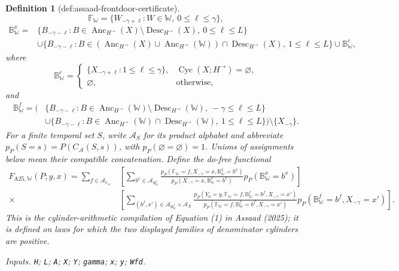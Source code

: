 \documentclass{article}
\newtheorem{definition}{Definition}
\begin{document}
\begin{definition}[def:assaad-frontdoor-certificate]
\[
 \mathbb F_{\mathbb W}
 =\{W_{-\gamma+\ell}:W\in\mathbb W,\ 0\le \ell\le\gamma\},
\]
\[
 \begin{split}
 \mathbb B^x_{\mathbb W}
 ={}&\{B_{-\gamma-\ell}:B\in
 \operatorname{Anc}_{H^{\to}}(X)\setminus
 \operatorname{Desc}_{H^{\to}}(X),\ 0\le\ell\le L\}\\
 &\cup\{B_{-\gamma-\ell}:B\in
 (\operatorname{Anc}_{H^{\to}}(X)\cup
 \operatorname{Anc}_{H^{\to}}(\mathbb W))\cap
 \operatorname{Desc}_{H^{\to}}(X),\ 1\le\ell\le L\}
 \cup\mathbb B^c_{\mathbb W},
 \end{split}
\]
where
\[
 \mathbb B^c_{\mathbb W}=
 \begin{cases}
 \{X_{-\gamma+\ell}:1\le\ell\le\gamma\},
 &\operatorname{Cyc}(X;H^{\to})=\varnothing,\\
 \varnothing,&\text{otherwise},
 \end{cases}
\]
and
\[
 \begin{split}
 \mathbb B^f_{\mathbb W}
 =\Big(&\{B_{-\gamma-\ell}:B\in
 \operatorname{Anc}_{H^{\to}}(\mathbb W)\setminus
 \operatorname{Desc}_{H^{\to}}(\mathbb W),\ -\gamma\le\ell\le L\}\\
 &\cup\{B_{-\gamma-\ell}:B\in
 \operatorname{Anc}_{H^{\to}}(\mathbb W)\cap
 \operatorname{Desc}_{H^{\to}}(\mathbb W),\ 1\le\ell\le L\}\Big)
 \setminus\{X_{-\gamma}\}.
 \end{split}
\]
For a finite temporal set \(S\), write \(\mathcal A_S\) for its product alphabet and abbreviate \(p_P(S=s)=P(C_{\mathcal A}(S,s))\), with \(p_P(\varnothing=\varnothing)=1\).  Unions of assignments below mean their compatible concatenation.  Define the do-free functional
\[
 \begin{split}
 F_{\mathrm{A25},\mathbb W}(P;y,x)
 =\sum_{f\in\mathcal A_{\mathbb F_{\mathbb W}}}
 &\left[\sum_{b^x\in\mathcal A_{\mathbb B^x_{\mathbb W}}}
 \frac{p_P(\mathbb F_{\mathbb W}=f,X_{-\gamma}=x,
 \mathbb B^x_{\mathbb W}=b^x)}
 {p_P(X_{-\gamma}=x,\mathbb B^x_{\mathbb W}=b^x)}
 p_P(\mathbb B^x_{\mathbb W}=b^x)\right]\\
 {}\times&\left[\sum_{(b^f,x')\in
 \mathcal A_{\mathbb B^f_{\mathbb W}}\times\mathcal A_X}
 \frac{p_P(Y_0=y,\mathbb F_{\mathbb W}=f,
 \mathbb B^f_{\mathbb W}=b^f,X_{-\gamma}=x')}
 {p_P(\mathbb F_{\mathbb W}=f,
 \mathbb B^f_{\mathbb W}=b^f,X_{-\gamma}=x')}
 p_P(\mathbb B^f_{\mathbb W}=b^f,X_{-\gamma}=x')\right].
 \end{split}
\]
This is the cylinder-arithmetic compilation of Equation (1) in Assaad (2025); it is defined on laws for which the two displayed families of denominator cylinders are positive.
\par\smallskip\noindent\emph{Inputs.} \texttt{H}; \texttt{L}; \texttt{A}; \texttt{X}; \texttt{Y}; \texttt{gamma}; \texttt{x}; \texttt{y}; \texttt{Wfd}.
\end{definition}
\end{document}
